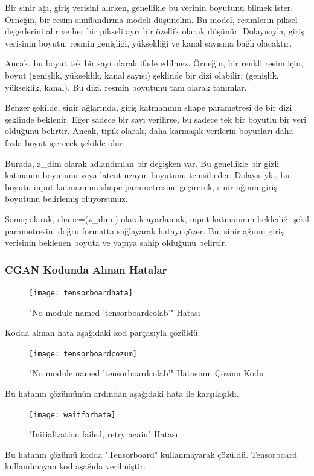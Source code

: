 \documentclass[12pt, a4paper]{article}
\begin{document}
	Bir sinir ağı, giriş verisini alırken, genellikle bu verinin boyutunu bilmek ister. Örneğin, bir resim sınıflandırma modeli düşünelim. Bu model, resimlerin piksel değerlerini alır ve her bir pikseli ayrı bir özellik olarak düşünür. Dolayısıyla, giriş verisinin boyutu, resmin genişliği, yüksekliği ve kanal sayısına bağlı olacaktır.
	
	Ancak, bu boyut tek bir sayı olarak ifade edilmez. Örneğin, bir renkli resim için, boyut (genişlik, yükseklik, kanal sayısı) şeklinde bir dizi olabilir: (genişlik, yükseklik, kanal). Bu dizi, resmin boyutunu tam olarak tanımlar.
	
	Benzer şekilde, sinir ağlarında, giriş katmanının shape parametresi de bir dizi şeklinde beklenir. Eğer sadece bir sayı verilirse, bu sadece tek bir boyutlu bir veri olduğunu belirtir. Ancak, tipik olarak, daha karmaşık verilerin boyutları daha fazla boyut içerecek şekilde olur.
	
	Burada, z\_dim olarak adlandırılan bir değişken var. Bu genellikle bir gizli katmanın boyutunu veya latent uzayın boyutunu temsil eder. Dolayısıyla, bu boyutu input katmanının shape parametresine geçirerek, sinir ağının giriş boyutunu belirlemiş oluyorsunuz.
	
	Sonuç olarak, shape=(z\_dim,) olarak ayarlamak, input katmanının beklediği şekil parametresini doğru formatta sağlayarak hatayı çözer. Bu, sinir ağının giriş verisinin beklenen boyuta ve yapıya sahip olduğunu belirtir.
	\clearpage
	\subsubsection{CGAN Kodunda Alınan Hatalar}
	\begin{figure}[h]
		\centering
		\texttt{[image: tensorboardhata]}
		\label{tensorboardhata}
		\caption{"No module named 'tensorboardcolab'" Hatası\cite{SZamboni-CGANCelebA-2024-05-13}}
	\end{figure}
	\FloatBarrier
	Kodda alınan hata aşağıdaki kod parçasıyla çözüldü.
	
	\begin{figure}[h]
		\centering
		\texttt{[image: tensorboardcozum]}
		\label{tensorboardcozum}
		\caption{"No module named 'tensorboardcolab'" Hatasının Çözüm Kodu\cite{SZamboni-CGANCelebA-2024-05-13}}
	\end{figure}
	\FloatBarrier
	Bu hatanın çözümünün ardından aşağıdaki hata ile karşılaşıldı.
	
	\begin{figure}[h]
		\centering
		\texttt{[image: waitforhata]}
		\label{waitforhata}
		\caption{"Initialization failed, retry again" Hatası\cite{SZamboni-CGANCelebA-2024-05-13}}
	\end{figure}
	\FloatBarrier
	Bu hatanın çözümü kodda "Tensorboard" kullanmayarak çözüldü\cite{ChatGPT-2024-05-29}. Tensorboard kullanılmayan kod aşağıda verilmiştir.
	\FloatBarrier
	\clearpage
	
\end{document}
